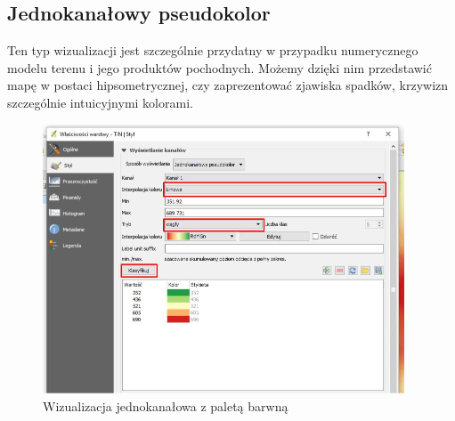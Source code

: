 \documentclass[12pt,a4paper]{book}
\begin{document}
\subsection{Jednokanałowy pseudokolor}
Ten typ wizualizacji jest szczególnie przydatny w przypadku numerycznego modelu terenu i jego produktów pochodnych. Możemy dzięki nim przedstawić mapę w postaci hipsometrycznej, czy zaprezentować zjawiska spadków, krzywizn szczególnie intuicyjnymi kolorami.
\begin{figure}[ht]
	\centering
	\includegraphics[height=8cm]{007-raster-pseudo.jpg}
	\caption{Wizualizacja jednokanałowa z paletą barwną}
\end{figure}
\end{document}
